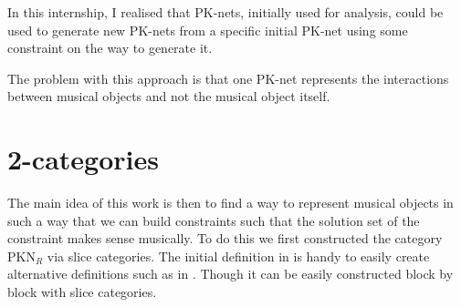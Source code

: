 In this internship, I realised that PK-nets, initially used for analysis, could be used to generate new PK-nets from a  specific initial PK-net using some constraint on the way to generate it.

The problem with this approach is that one PK-net represents the interactions between musical objects and not the musical object itself.


\section{2-categories}
The main idea of this work is then to find a way to represent musical objects in such a way that we can build constraints such that the solution set of the constraint makes sense musically. To do this we first constructed the category $\text{PKN}_R$ via slice categories. The initial definition in \cite{popoff2015categorical} is handy to easily create alternative definitions such as in \cite{popoff2016relational}. Though it can be easily constructed block by block with slice categories.


